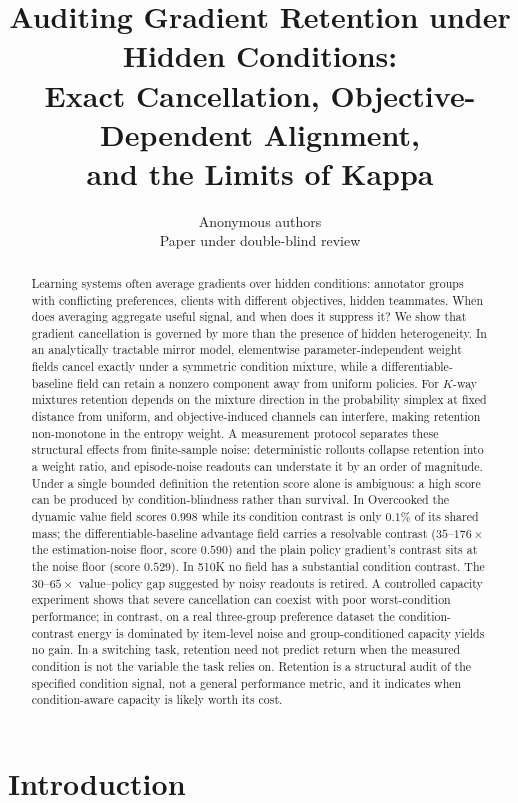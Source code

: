 \documentclass{article}
\title{Auditing Gradient Retention under Hidden Conditions:\\
Exact Cancellation, Objective-Dependent Alignment,\\
and the Limits of Kappa}
\author{Anonymous authors\\Paper under double-blind review}
\begin{document}
\maketitle

\begin{abstract}
Learning systems often average gradients over hidden conditions: annotator
groups with conflicting preferences, clients with different objectives,
hidden teammates. When does averaging aggregate useful signal, and when does
it suppress it? We show that gradient cancellation is governed by more than
the presence of hidden heterogeneity. In an analytically tractable mirror
model, elementwise parameter-independent weight fields cancel exactly under a
symmetric condition mixture, while a differentiable-baseline field can retain
a nonzero component away from uniform policies. For $K$-way mixtures retention
depends on the mixture direction in the probability simplex at fixed distance
from uniform, and objective-induced channels can interfere, making retention
non-monotone in the entropy weight. A measurement protocol separates these
structural effects from finite-sample noise: deterministic rollouts collapse
retention into a weight ratio, and episode-noise readouts can understate it by
an order of magnitude. Under a single
bounded definition the retention score alone is ambiguous: a high score can
be produced by condition-blindness rather than survival. In Overcooked the
dynamic value field scores $0.998$ while its condition contrast is only
$0.1\%$ of its shared mass; the differentiable-baseline advantage field
carries a resolvable contrast ($35$--$176\times$ the estimation-noise floor,
score $0.590$) and the plain policy gradient's contrast sits at the noise
floor (score $0.529$). In 510K no field has a substantial condition
contrast. The $30$--$65\times$ value--policy gap suggested by noisy readouts
is retired. A
controlled capacity experiment shows that severe cancellation can coexist with
poor worst-condition performance; in contrast, on a real three-group
preference dataset the condition-contrast energy is dominated by item-level
noise and group-conditioned capacity yields no gain. In a switching task,
retention need not predict return when the measured condition is not the
variable the task relies on. Retention is a structural audit of the specified
condition signal, not a general performance metric, and it indicates when
condition-aware capacity is likely worth its cost.
\end{abstract}

\section{Introduction}
\label{sec:intro}
\end{document}

